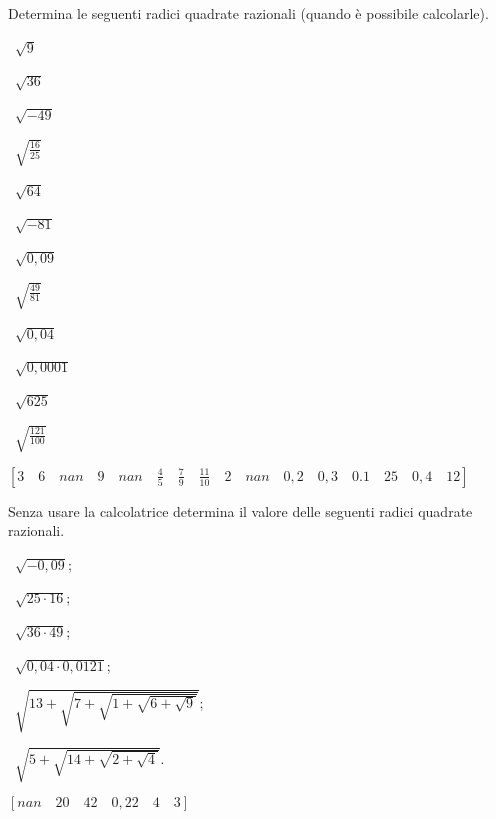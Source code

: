 \begin{esercizio}
 \label{ese:2.01}
Determina le seguenti radici quadrate razionali 
(quando è possibile calcolarle).
\vspace{-.7em}
\begin{multicols}{4}
 \begin{enumeratea}
 \item~\(\sqrt 9\)
 \item~\(\sqrt{36}\)
 \item~\(\sqrt{-49}\)
 \item~\(\sqrt{\frac{16}{25}}\)
 \item~\(\sqrt{64}\)
 \item~\(\sqrt{-81}\)
 \item~\(\sqrt{0,09}\)
 \item~\(\sqrt{\frac{49}{81}}\)
 \item~\(\sqrt{0,04}\)
 \item~\(\sqrt{0,0001}\)
 \item~\(\sqrt{625}\)
 \item~\(\sqrt{\frac{121}{100}}\)
 \end{enumeratea}
 \end{multicols}
\begin{flushright}
\vspace*{-8pt}
 \([3 \quad 6 \quad nan \quad 9 \quad nan \quad 
 \frac{4}{5} \quad \frac{7}{9} \quad \frac{11}{10} \quad 2 \quad 
 nan \quad 0,2 \quad 0,3 \quad 0.1 \quad 25 \quad 0,4 \quad 12]\)
\end{flushright}
\vspace{-.7em}
\end{esercizio}

\newpage %

\begin{esercizio}
 \label{ese:2.02}
Senza usare la calcolatrice determina il valore delle seguenti radici 
quadrate razionali.
\vspace{-.7em}
\begin{multicols}{2}
 \begin{enumeratea}
 \item~\(\sqrt{-0,09}\);
 \item~\(\sqrt{25\cdot 16}\);
 \item~\(\sqrt{36\cdot 49}\);
 \item~\(\sqrt{0,04\cdot 0,0121}\);
 \item~\(\sqrt{13+\sqrt{7+\sqrt{1+\sqrt{6+\sqrt 9}}}}\);
 \item~\(\sqrt{5+\sqrt{14+\sqrt{2+\sqrt 4}}}\).
 \end{enumeratea}
 \end{multicols}
\begin{flushright}
\vspace*{-8pt}
\([nan \quad 20 \quad 42 \quad 0,22 \quad 4 \quad 3]\)
\end{flushright}
\vspace{-.7em}
\end{esercizio}

